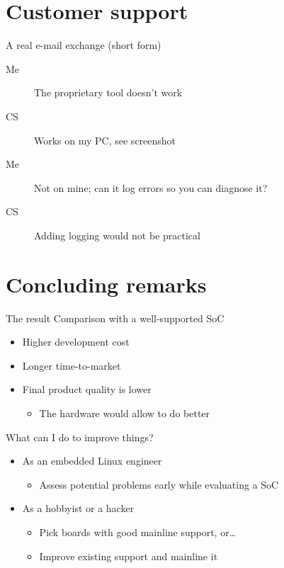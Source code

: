 \documentclass[xetex,table,aspectratio=169]{beamer}
\begin{document}
\section{Customer support}

\begin{frame}{A real e-mail exchange (short form)}
  \begin{description}
  \item[Me] The proprietary tool doesn't work
    \pause
  \item[CS] Works on my PC, see screenshot
    \pause
  \item[Me] Not on mine; can it log errors so you can diagnose it?
    \pause
  \item[CS] Adding logging would not be practical
  \end{description}
\end{frame}

\section{Concluding remarks}

\begin{frame}{The result}
  Comparison with a well-supported SoC
  \begin{itemize}
  \item Higher development cost
  \item Longer time-to-market
  \item Final product quality is lower
    \begin{itemize}
    \item The hardware would allow to do better
    \end{itemize}
  \end{itemize}
\end{frame}

\begin{frame}{What can I do to improve things?}
  \begin{itemize}
  \item As an embedded Linux engineer
    \begin{itemize}
    \item Assess potential problems early while evaluating a SoC
    \end{itemize}
  \item As a hobbyist or a hacker
    \begin{itemize}
    \item Pick boards with good mainline support, or\dots
    \item Improve existing support and mainline it
    \end{itemize}
  \end{itemize}
\end{frame}
\end{document}
